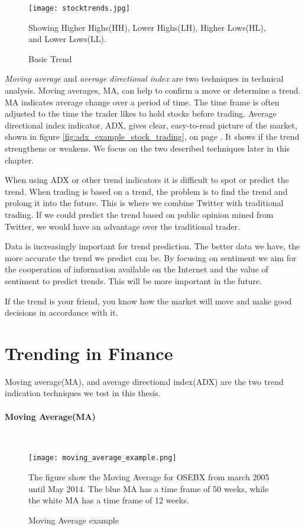 \begin{figure}[htb]
    \centering
    \texttt{[image: stocktrends.jpg]} 
    \label{fig:stocktrends}
    \caption{Basic Trend}
Showing Higher Highs(HH), Lower Highs(LH), Higher Lows(HL), and Lower Lows(LL). 
\end{figure}

\textit{Moving average} and \textit{average directional index} are two
techniques in technical analysis. Moving averages, MA, can help to confirm a
move or determine a trend. MA indicates average change over a
period of time. The time frame is often adjusted to the time the trader likes to
hold stocks before trading. Average directional index indicator, ADX, gives
clear, easy-to-read picture of the market, shown in figure
\ref{fig:adx_example_stock_trading}, on page
\pageref{fig:adx_example_stock_trading}. It shows if the trend strengthens or
weakens. We focus on the two described techniques later in this chapter.

When using ADX or other trend indicators it is difficult to spot or predict the
trend. When trading is based on a trend, the problem is to find
the trend and prolong it into the future. This is where we combine Twitter
with traditional trading. If we could predict the trend based on public opinion
mined from Twitter, we would have an advantage over the traditional trader. 

Data is increasingly important for trend prediction. The better data we have,
the more accurate the trend we predict can be. By focusing on sentiment we aim
for the cooperation of information available on the Internet and the value of
sentiment to predict trends. This will be more important in the future. 

If the trend is your friend, you know how the market will move and make
good decisions in accordance with it. 
%

\section{Trending in Finance}\label{trend:trends_in_finance}
Moving average(MA), and average directional index(ADX) are the two trend
indication techniques we test in this thesis. 

\paragraph{Moving Average(MA)}
\hspace{0pt}\\
\begin{figure}[htb]
    \centering
    \texttt{[image: moving\_average\_example.png]}
    \label{fig:moving_average_example}
    \caption{Moving Average example}
The figure show the Moving Average for OSEBX from march 2005 until May 2014. The
blue MA has a time frame of 50 weeks, while the white MA has a time frame of 12
weeks. 
\end{figure}

